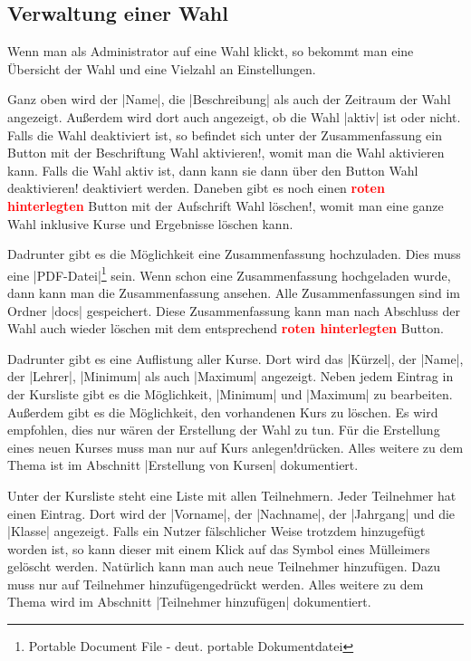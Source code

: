 \documentclass[ngerman]{ltxdoc}
\begin{document}
\subsection{Verwaltung einer Wahl}

Wenn man als Administrator auf eine Wahl klickt, so bekommt man eine Übersicht
der Wahl und eine Vielzahl an Einstellungen.

Ganz oben wird der |Name|, die |Beschreibung| als auch der Zeitraum der Wahl angezeigt.
Außerdem wird dort auch angezeigt, ob die Wahl |aktiv| ist oder nicht. Falls die
Wahl deaktiviert ist, so befindet sich unter der Zusammenfassung ein Button mit der
Beschriftung \glqq Wahl aktivieren!\grqq, womit man die Wahl aktivieren kann. Falls
die Wahl aktiv ist, dann kann sie dann über den Button \glqq Wahl deaktivieren!\grqq
deaktiviert werden. Daneben gibt es noch einen \textcolor{red}{\textbf{roten hinterlegten}}
Button mit der Aufschrift \glqq Wahl löschen!\grqq, womit man eine ganze Wahl inklusive
Kurse und Ergebnisse löschen kann.

Dadrunter gibt es die Möglichkeit eine Zusammenfassung hochzuladen. Dies muss eine
|PDF-Datei|\footnote{Portable Document File - deut. portable Dokumentdatei} sein.
Wenn schon eine Zusammenfassung hochgeladen wurde, dann kann man die Zusammenfassung
ansehen. Alle Zusammenfassungen sind im Ordner |docs| gespeichert. Diese Zusammenfassung
kann man nach Abschluss der Wahl auch wieder löschen mit dem entsprechend \textcolor{red}{\textbf{roten hinterlegten}}
Button.

Dadrunter gibt es eine Auflistung aller Kurse. Dort wird das |Kürzel|, der |Name|,
der |Lehrer|, |Minimum| als auch |Maximum| angezeigt. Neben jedem Eintrag in der
Kursliste gibt es die Möglichkeit, |Minimum| und |Maximum| zu bearbeiten. Außerdem
gibt es die Möglichkeit, den vorhandenen Kurs zu löschen. Es wird empfohlen, dies
nur wären der Erstellung der Wahl zu tun. Für die Erstellung eines neuen Kurses
muss man nur auf \glqq Kurs anlegen!\grqq drücken. Alles weitere zu dem Thema ist
im Abschnitt |Erstellung von Kursen| dokumentiert.

Unter der Kursliste steht eine Liste mit allen Teilnehmern. Jeder Teilnehmer
hat einen Eintrag. Dort wird der |Vorname|, der |Nachname|, der |Jahrgang|
und die |Klasse| angezeigt. Falls ein Nutzer fälschlicher Weise trotzdem hinzugefügt
worden ist, so kann dieser mit einem Klick auf das Symbol eines Mülleimers gelöscht
werden. Natürlich kann man auch neue Teilnehmer hinzufügen. Dazu muss nur auf
\glqq Teilnehmer hinzufügen\grqq gedrückt werden. Alles weitere zu dem Thema wird
im Abschnitt |Teilnehmer hinzufügen| dokumentiert.
\end{document}
